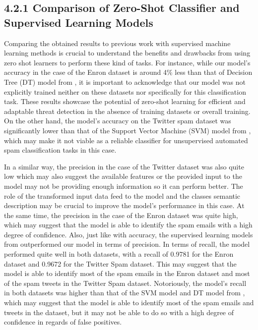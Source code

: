 \documentclass[letterpaper,twocolumn,fleqn]{article}
\begin{document}
\subsection*{4.2.1 Comparison of Zero-Shot Classifier and Supervised Learning Models}
Comparing the obtained results to previous work with supervised machine learning methods is crucial to understand the benefits and drawbacks from using zero shot learners to perform these kind of tasks. For instance, while our model's accuracy in the case of the Enron dataset is around 4\% less than that of Decision Tree (DT) model from \cite{shaukatCyberThreatDetection2020}, it is important to acknowledge that our model was not explicitly trained neither on these datasets nor specifically for this classification task. These results showcase the potential of zero-shot learning for efficient and adaptable threat detection in the absence of training datasets or overall training. On the other hand, the model's accuracy on the Twitter spam dataset was significantly lower than that of the Support Vector Machine (SVM) model from \cite{shaukatCyberThreatDetection2020}, which may make it not viable as a reliable classifier for unsupervised automated spam classification tasks in this case.

In a similar way, the precision in the case of the Twitter dataset was also quite low which may also suggest the available features or the provided input to the model may not be providing enough information so it can perform better. The role of the transformed input data feed to the model and the classes semantic description may be crucial to improve the model's performance in this case. At the same time, the precision in the case of the Enron dataset was quite high, which may suggest that the model is able to identify the spam emails with a high degree of confidence. Also, just like with accuracy, the supervised learning models from \cite{shaukatCyberThreatDetection2020} outperformed our model in terms of precision.
In terms of recall, the model performed quite well in both datasets, with a recall of 0.9781 for the Enron dataset and 0.9672 for the Twitter Spam dataset. This may suggest that the model is able to identify most of the spam emails in the Enron dataset and most of the spam tweets in the Twitter Spam dataset. Notoriously, the model's recall in both datasets was higher than that of the SVM model and DT model from \cite{shaukatCyberThreatDetection2020}, which may suggest that the model is able to identify most of the spam emails and tweets in the dataset, but it may not be able to do so with a high degree of confidence in regards of false positives.
\end{document}
